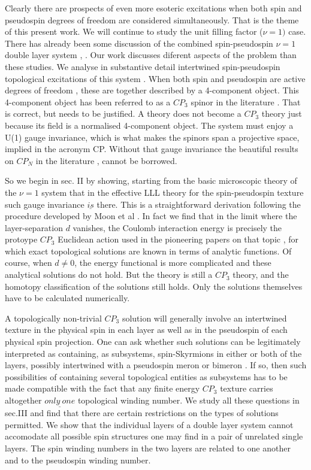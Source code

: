 Clearly there are prospects of even more esoteric excitations
when both  spin and pseudospin degrees of freedom are considered
simultaneously. That is the theme of this present work. We will
continue to study the  unit filling factor ($ \nu = 1 )$ case.
There has already been some discussion of the combined
spin-pseudospin $\nu = 1 $ double layer system  \cite{Arov},
\cite{Ezawa}. Our work  discusses diferent aspects of the
problem than these studies. We analyse in substantive detail
intertwined spin-pseudospin topological excitations of this
system . When both spin and pseudospin are active degrees of
freedom , these are together described by a 4-component object.
This 4-component object has been referred to as a $CP_{3}$
spinor in the literature \cite{Ezawa}.  That is correct, but
needs to be justified. A theory does not become  a $CP_{3}$
theory just because its field is a normalised 4-component
object. The system must enjoy a U(1) gauge invariance, which is
what makes the spinors span a projective space, implied in the
acronym CP. Without that gauge invariance the beautiful results
on $CP_{N}$ in the literature \cite{CP}, \cite{Raj} cannot be
borrowed.
 
 So we begin in sec. II  by showing, starting from the basic
microscopic theory of the $\nu = 1 $ system that  in the
effective LLL theory for the  spin-pseudospin texture such
gauge invariance $\underline{is}$ there. This is a
straightforward derivation following the procedure developed by
Moon et al \cite{Moon}.  In fact we find that in the limit where
the layer-separation $d$ vanishes, the Coulomb interaction
energy is precisely the protoype $CP_{3}$ Euclidean action used
in the pioneering papers  on that topic \cite{CP}, for which
exact topological solutions are known in terms of analytic
functions.  Of course, when $d\neq 0$, the energy functional is
more complicated and these analytical solutions do not hold.
But the theory is still a $CP_{3}$ theory, and the homotopy
classification of the solutions still holds. Only the solutions
themselves have to be calculated numerically.

 A topologically non-trivial $CP_{3}$ solution will generally
involve an intertwined texture in the physical spin in each
layer as well as in the pseudospin of each physical spin
projection.  One can ask whether such solutions can be
legitimately interpreted as containing, as subsystems,
spin-Skyrmions in either or  both of the layers, possibly
intertwined with a pseudospin meron or bimeron . If so, then
such possibilities of containing several  topological entities
as subsystems has to be made compatible with the fact that any
finite energy $CP_{3}$ texture carries altogether
$\underline{only  \ one}$ topological winding number. We study
all these questions in sec.III and find that there are certain
restrictions on the types of solutions permitted. We show that
the individual layers of a double layer system cannot accomodate
all possible spin structures one may find in a pair of unrelated
single layers. The spin winding numbers in the two layers are
related to one another and to the  pseudospin winding number.
 
